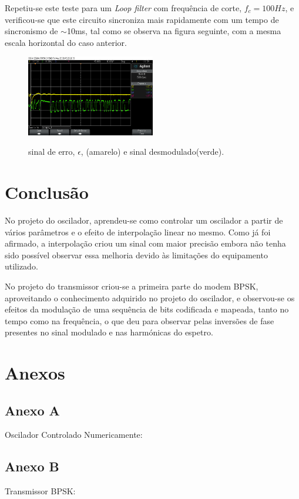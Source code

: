 \documentclass[11pt]{article}
\numberwithin{equation}{section}
\begin{document}
Repetiu-se este teste para um \textit{Loop filter} com frequência de corte, $f_c = 100Hz$, e verificou-se que este circuito sincroniza mais rapidamente com um tempo de sincronismo de $\sim$10ms, tal como se observa na figura seguinte, com a mesma escala horizontal do caso anterior.

\begin{figure}[H]
	\centering
	\includegraphics[width=0.5\textwidth]{./transient100Hz}~\\
	\caption{sinal de erro, $\epsilon$, (amarelo) e sinal desmodulado(verde).}
	\label{trans100}
\end{figure}


\section{Conclusão}


No projeto do oscilador, aprendeu-se como controlar um oscilador a partir de vários parâmetros e o efeito de interpolação linear no mesmo. Como já foi afirmado, a interpolação criou um sinal com maior precisão embora não tenha sido possível observar essa melhoria devido às limitações do equipamento utilizado.

 No projeto do transmissor criou-se a primeira parte do modem BPSK, aproveitando o conhecimento adquirido no projeto do oscilador, e observou-se os efeitos da modulação de uma sequência de bits codificada e mapeada, tanto no tempo como na frequência, o que deu para observar pelas inversões de fase presentes no sinal modulado e nas harmónicas do espetro.

\section{Anexos}
\subsection{Anexo A}
Oscilador Controlado Numericamente:


\subsection{Anexo B}
Transmissor BPSK:

	
\end{document}

